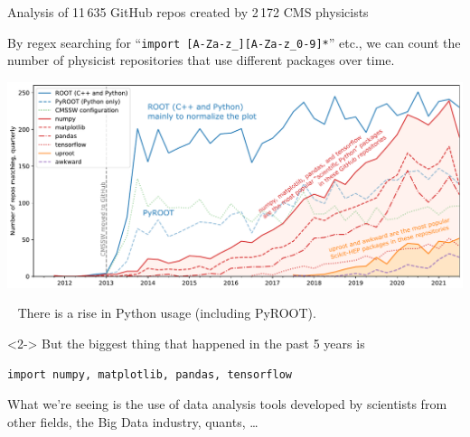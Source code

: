 \documentclass[aspectratio=169]{beamer}
\begin{document}
\begin{frame}{Analysis of 11\,635 GitHub repos created by 2\,172 CMS physicists}
\vspace{0.25 cm}

By regex searching for ``\texttt{import [A-Za-z_][A-Za-z_0-9]*}'' etc., we can count the number of physicist repositories that use different packages over time.

\vspace{0.2 cm}

\includegraphics[width=\linewidth]{PLOTS/gihub-package-fullstudy.pdf}
\end{frame}

\begin{frame}[fragile]{\mbox{ }}
\Large
There is a rise in Python usage (including PyROOT).

\vspace{1.5 cm}
\begin{uncoverenv}<2->
But the biggest thing that happened in the past 5 years is

\begin{center}
\begin{minipage}{0.95\linewidth}
\begin{verbatim}
import numpy, matplotlib, pandas, tensorflow
\end{verbatim}
\end{minipage}
\end{center}

\vspace{0.2 cm}
\begin{spacing}{1.0}
What we're seeing is the use of data analysis tools developed by scientists from other fields, the Big Data industry, quants, \dots
\end{spacing}
\end{uncoverenv}
\end{frame}
\end{document}
